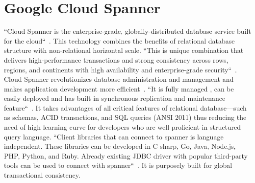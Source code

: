 \section{Google Cloud Spanner}

``Cloud Spanner is the enterprise-grade, globally-distributed database 
service built for the cloud``~\cite{hid-sp18-523-www-google-spanner}. 
This technology combines the benefits of relational database structure 
with non-relational horizontal scale. ``This is unique combination that 
delivers high-performance transactions and strong consistency across rows, 
regions, and continents with high availability and enterprise-grade 
security``~\cite{hid-sp18-523-www-google-spanner}. Cloud Spanner 
revolutionizes database administration and management and makes 
application development more efficient~\cite{hid-sp18-523-www-google-spanner}.
``It is fully managed , can be easily deployed and has built in synchronous 
replication and maintenance feature``~\cite{hid-sp18-523-www-google-spanner}. 
It takes advantages of all critical features of relational database—such 
as schemas, ACID transactions, and SQL queries (ANSI 2011) thus reducing 
the need of high learning curve for developers who are well proficient in 
structured query language. 
``Client libraries that can connect to spanner is language independent. 
These libraries can be developed in C sharp, Go, Java, Node.js, PHP, Python, 
and Ruby. Already existing JDBC driver with popular third-party tools can be 
used to connect with spanner``~\cite{hid-sp18-523-www-google-spanner}. It is 
purposely built for global transactional consistency.
